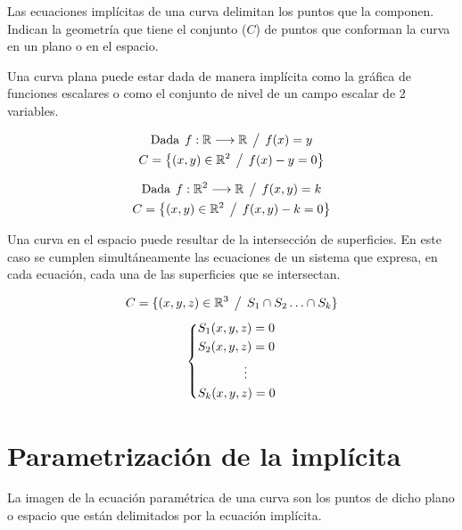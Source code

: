 \documentclass[a5paper,12pt,twoside]{book}
\begin{document}
Las ecuaciones implícitas de una curva delimitan los puntos que la componen. Indican la geometría que tiene el conjunto ($C$) de puntos que conforman la curva en un plano o en el espacio.

Una curva plana puede estar dada de manera implícita como la gráfica de funciones escalares o como el conjunto de nivel de un campo escalar de 2 variables.

\begin{gather*}
    \textrm{Dada} \hspace{1ex} f:\mathbb{R} \longrightarrow \mathbb{R} \hspace{1ex} \big/ \hspace{1ex} f(x)=y
    \\
    C = { \left\{ { (x,y) \in \mathbb{R}^2 \hspace{1ex} \big/ \hspace{1ex} f(x)-y=0 } \right\} }
\end{gather*}

\begin{gather*}
    \textrm{Dada} \hspace{1ex} f:\mathbb{R}^2 \longrightarrow \mathbb{R} \hspace{1ex} \big/ \hspace{1ex} f(x,y)=k
    \\
    C = { \left\{ { (x,y) \in \mathbb{R}^2 \hspace{1ex} \big/ \hspace{1ex} f(x,y)-k=0 } \right\} }
\end{gather*}

Una curva en el espacio puede resultar de la intersección de superficies. En este caso se cumplen simultáneamente las ecuaciones de un sistema que expresa, en cada ecuación, cada una de las superficies que se intersectan.

\begin{gather*}
    C = \{ (x,y,z) \in \mathbb{R}^3 \hspace{1ex} \big/ \hspace{1ex} S_1 \cap S_2 \ldots \cap S_k \}
    \\[1ex]
    \left\{
    \begin{aligned}
        & S_1 (x,y,z)=0
        \\
        & S_2 (x,y,z)=0
        \\
        & \hspace{1.3cm} \vdots
        \\
        & S_k (x,y,z)=0
    \end{aligned}
    \right.
\end{gather*}

\section{Parametrización de la implícita}

La imagen de la ecuación paramétrica de una curva son los puntos de dicho plano o espacio que están delimitados por la ecuación implícita.
\end{document}
